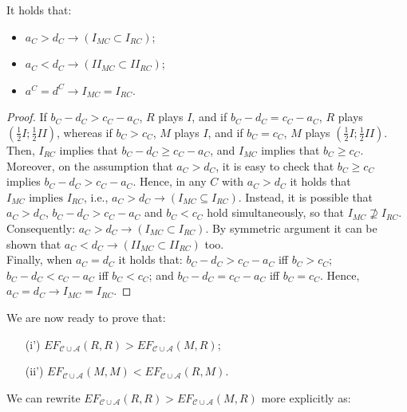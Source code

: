 \documentclass[fleqn,reqno,11pt]{article}
\begin{document}
\medskip{}

\begin{lemma} \label{lemma:action implications}
It holds that:
\begin{itemize}
\item $a_{C}>d_{C}\rightarrow(I_{MC}\subset I_{RC})$;
\item $a_{C}<d_{C}\rightarrow(II_{MC}\subset II_{RC})$;
\item $a^{C}=d^{C}\rightarrow I_{MC}=I_{RC}$.
\end{itemize}
\end{lemma}

\begin{proof}
If $b_{C}-d_{C}>c_{C}-a_{C}$, $R$ plays
$I$, and if $b_{C}-d_{C}=c_{C}-a_{C}$, $R$ plays
$(\frac{1}{2}I;\frac{1}{2}II)$, whereas if $b_{C}>c_{C}$,
$M$ plays $I$, and if $b_{C}=c_{C}$, $M$ plays $(\frac{1}{2}I;\frac{1}{2}II)$.
Then, $I_{RC}$ implies that $b_{C}-d_{C}\geq c_{C}-a_{C}$,
and $I_{MC}$ implies that $b_{C}\geq c_{C}$. Moreover,
on the assumption that $a_{C}>d_{C}$, it is easy to check
that $b_{C}\geq c_{C}$ implies $b_{C}-d_{C}>c_{C}-a_{C}$.
Hence, in any $C$ with $a_{C}>d_{C}$ it holds that $I_{MC}\mbox{ implies }I_{RC}$,
i.e., $a_{C}>d_{C}\rightarrow(I_{MC}\subseteq I_{RC})$.
Instead, it is possible that $a_{C}>d_{C}$, $b_{C}-d_{C}>c_{C}-a_{C}$
and $b_{C}<c_{C}$ hold simultaneously, so that $I_{MC}\nsupseteq I_{RC}$.
Consequently: $a_{C}>d_{C}\rightarrow(I_{MC}\subset I_{RC})$.
By symmetric argument it can be shown that $a_{C}<d_{C}\rightarrow(II_{MC}\subset II_{RC})$
too. \\
Finally, when $a_{C}=d_{C}$ it holds that: $b_{C}-d_{C}>c_{C}-a_{C}$
iff $b_{C}>c_{C}$; $b_{C}-d_{C}<c_{C}-a_{C}$
iff $b_{C}<c_{C}$; and $b_{C}-d_{C}=c_{C}-a_{C}$
iff $b_{C}=c_{C}$. Hence, $a_{C}=d_{C}\rightarrow I_{MC}=I_{RC}$.
\end{proof}

\medskip{}


\noindent We are now ready to prove that:
\begin{itemize}
\item[(i')] $EF_{\mathcal{C}\cup\mathcal{A}}(R,R)>EF_{\mathcal{C}\cup\mathcal{A}}(M,R);$
\item[(ii')] $EF_{\mathcal{C}\cup\mathcal{A}}(M,M)<EF_{\mathcal{C}\cup\mathcal{A}}(R,M).$
\end{itemize}
We can rewrite $EF_{\mathcal{C}\cup\mathcal{A}}(R,R)>EF_{\mathcal{C}\cup\mathcal{A}}(M,R)$
more explicitly as:

\medskip{}
\end{document}
